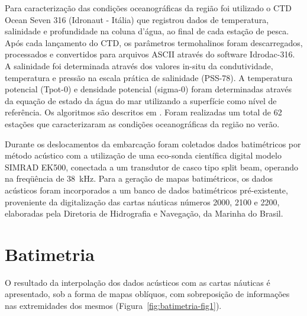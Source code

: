 \documentclass[a4paper,11pt,twoside,showtrims,onecolumn,openright,final]{memoir}
\begin{document}
Para caracterização das condições oceanográficas da região foi utilizado o 
CTD Ocean Seven 316 (Idronaut - Itália) que registrou dados de temperatura, salinidade e profundidade
na coluna d'água, ao final de cada estação de pesca.
Após cada lançamento do CTD, os parâmetros termohalinos 
foram descarregados, processados e convertidos para 
arquivos ASCII através do software Idrodac-316. 
A salinidade foi determinada através dos valores in-situ 
da condutividade, temperatura e pressão na escala prática de salinidade 
(PSS-78). A temperatura potencial (Tpot-0) e densidade potencial (sigma-0) 
foram determinadas através da equação de estado da água do mar utilizando a 
superfície como nível de referência. Os algoritmos são descritos 
em \citet{fofonoff1983}. %
Foram realizadas um total de 62 estações que caracterizaram
as condições oceanográficas da região no verão.

Durante os deslocamentos da embarcação foram coletados dados batimétricos por método acústico
com a utilização de uma eco-sonda científica digital modelo SIMRAD EK500, conectada a um 
transdutor de casco tipo split beam, operando na freqüência de 38~kHz. Para a geração 
de mapas batimétricos, os dados acústicos foram incorporados a um banco de dados 
batimétricos pré-existente, proveniente da digitalização das cartas náuticas números 2000, 2100 e 2200, 
elaboradas pela Diretoria de Hidrografia e Navegação, da Marinha do Brasil.


\section*{Batimetria}

O resultado da interpolação dos dados acústicos com as cartas náuticas é apresentado, 
sob a forma de mapas oblíquos, com sobreposição 
de informações nas extremidades dos mesmos (Figura~\ref{fig:batimetria-fig1}).

%
\end{document}
